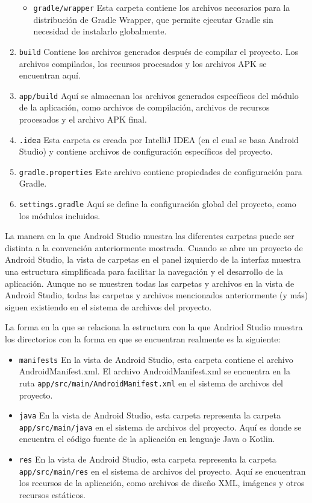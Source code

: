\begin{enumerate}
    \begin{itemize}
        \item \texttt{gradle/wrapper} Esta carpeta contiene los archivos necesarios para la distribución de Gradle Wrapper, que permite ejecutar Gradle sin necesidad de instalarlo globalmente.
    \end{itemize}
    \item \texttt{build} Contiene los archivos generados después de compilar el proyecto. Los archivos compilados, los recursos procesados y los archivos APK se encuentran aquí.
    \item \texttt{app/build} Aquí se almacenan los archivos generados específicos del módulo de la aplicación, como archivos de compilación, archivos de recursos procesados y el archivo APK final.
    \item \texttt{.idea} Esta carpeta es creada por IntelliJ IDEA (en el cual se basa Android Studio) y contiene archivos de configuración específicos del proyecto.
    \item \texttt{gradle.properties} Este archivo contiene propiedades de configuración para Gradle.
    \item \texttt{settings.gradle}  Aquí se define la configuración global del proyecto, como los módulos incluidos.
\end{enumerate}

La manera en la que Android Studio muestra las diferentes carpetas puede ser distinta a la convención anteriormente mostrada. Cuando se abre un proyecto de Android Studio, la vista de carpetas en el panel izquierdo de la interfaz muestra una estructura simplificada para facilitar la navegación y el desarrollo de la aplicación. Aunque no se muestren todas las carpetas y archivos en la vista de Android Studio, todas las carpetas y archivos mencionados anteriormente (y más) siguen existiendo en el sistema de archivos del proyecto.

La forma en la que se relaciona la estructura con la que Andriod Studio muestra los directorios con la forma en que se encuentran realmente es la siguiente:

\begin{itemize}
    \item \texttt{manifests}  En la vista de Android Studio, esta carpeta contiene el archivo AndroidManifest.xml. El archivo AndroidManifest.xml se encuentra en la ruta \texttt{app/src/main/AndroidManifest.xml} en el sistema de archivos del proyecto.
    \item \texttt{java} En la vista de Android Studio, esta carpeta representa la carpeta \texttt{app/src/main/java} en el sistema de archivos del proyecto. Aquí es donde se encuentra el código fuente de la aplicación en lenguaje Java o Kotlin.
    \item \texttt{res}  En la vista de Android Studio, esta carpeta representa la carpeta \texttt{app/src/main/res} en el sistema de archivos del proyecto. Aquí se encuentran los recursos de la aplicación, como archivos de diseño XML, imágenes y otros recursos estáticos.
\end{itemize}

